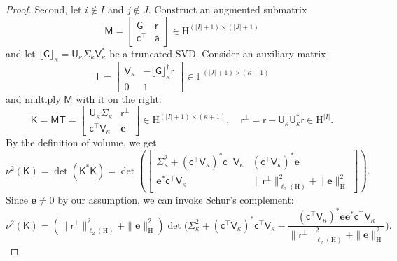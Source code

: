 \documentclass[onefignum,onetabnum]{siamart250211}
\renewenvironment{equation*}{\[}{\]\ignorespacesafterend}
\newcommand{\F}{\mathbb{F}}
\newcommand{\Hilb}{\mathrm{H}}
\newcommand{\Batrix}[1]{\bm{\Matrix{#1}}}
\newcommand{\Matrix}[1]{\mathsf{#1}}
\newcommand{\Bentry}[1]{{\bm{#1}}}
\newcommand{\trans}{\intercal}
\newcommand{\pinv}{\dagger}
\newcommand{\truncate}[3][]{#1\lfloor #2 #1\rfloor_{#3}}
\newcommand{\Index}[1]{{#1}}
\newcommand{\Norm}[3][]{#1\| #2 #1\|_{\mathrm{#3}}}
\begin{document}
\begin{proof}
Second, let $i \not\in \Index{I}$ and $j \not\in \Index{J}$.
Construct an augmented submatrix
\begin{equation*}
    \Batrix{M} = \begin{bmatrix}
        \Batrix{G} & \Batrix{r} \\
        \Batrix{c}^\trans & \Batrix{a}
    \end{bmatrix} \in \Hilb^{(|\Index{I}| + 1) \times (|\Index{J}| + 1)}
\end{equation*}
and let $\truncate{\Batrix{G}}{\kappa} = \Batrix{U}_{\kappa} \Matrix{\Sigma}_{\kappa} \Matrix{V}_{\kappa}^\ast$ be a truncated SVD.
Consider an auxiliary matrix
\begin{equation*}
    \Matrix{T} = \begin{bmatrix}
        \Matrix{V}_{\kappa} & -\truncate{\Batrix{G}}{\kappa}^\pinv \Batrix{r} \\
        0 & 1
    \end{bmatrix} \in \F^{(|\Index{J}| + 1) \times (\kappa + 1)}
\end{equation*}
and multiply $\Batrix{M}$ with it on the right:
\begin{equation*}
    \Batrix{K} = \Batrix{M} \Matrix{T} = \begin{bmatrix}
        \Batrix{U}_{\kappa} \Matrix{\Sigma}_{\kappa} & \Batrix{r}^\perp \\
        \Batrix{c}^\trans \Matrix{V}_{\kappa} & \Bentry{e}
    \end{bmatrix} \in \Hilb^{(|\Index{I}| + 1) \times (\kappa + 1)}, \quad \Batrix{r}^\perp = \Batrix{r} - \Batrix{U}_{\kappa} \Batrix{U}_{\kappa}^\ast \Batrix{r} \in \Hilb^{|\Index{I}|}.
\end{equation*}
By the definition of volume, we get
\begin{equation*}
    \nu^2(\Batrix{K}) = \det(\Batrix{K}^\ast \Batrix{K}) = \det \left( \begin{bmatrix}
        \Matrix{\Sigma}_{\kappa}^2 + (\Batrix{c}^\trans \Matrix{V}_{\kappa})^\ast \Batrix{c}^\trans \Matrix{V}_{\kappa} & (\Batrix{c}^\trans \Matrix{V}_{\kappa})^\ast \Bentry{e} \\
        \Bentry{e}^\ast \Batrix{c}^\trans \Matrix{V}_{\kappa} & \Norm{\Batrix{r}^\perp}{\ell_2(\Hilb)}^2 + \Norm{\Bentry{e}}{\Hilb}^2
    \end{bmatrix} \right).
\end{equation*}
Since $\Bentry{e} \neq 0$ by our assumption, we can invoke Schur's complement:
\begin{equation*}
    \nu^2(\Batrix{K}) = (\Norm{\Batrix{r}^\perp}{\ell_2(\Hilb)}^2 + \Norm{\Bentry{e}}{\Hilb}^2) \det\bigg( \Matrix{\Sigma}_{\kappa}^2 + (\Batrix{c}^\trans \Matrix{V}_{\kappa})^\ast \Batrix{c}^\trans \Matrix{V}_{\kappa} - \frac{(\Batrix{c}^\trans \Matrix{V}_{\kappa})^\ast \Bentry{e} \Bentry{e}^\ast \Batrix{c}^\trans \Matrix{V}_{\kappa}}{\Norm{\Batrix{r}^\perp}{\ell_2(\Hilb)}^2 + \Norm{\Bentry{e}}{\Hilb}^2} \bigg).

\end{equation*}
\end{proof}
\end{document}
